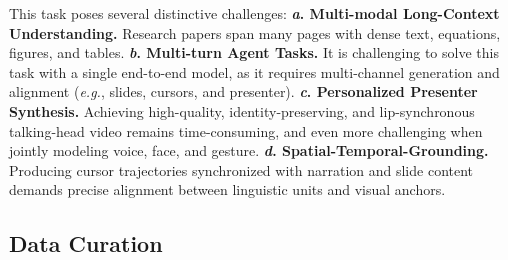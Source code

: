 \vspace{-0.2\baselineskip}
This task poses several distinctive challenges: 
\textbf{\textit{a}. Multi-modal Long-Context Understanding.} Research papers span many pages with dense text, equations, figures, and tables.
\textbf{\textit{b}. Multi-turn Agent Tasks.} It is challenging to solve this task with a single end-to-end model, as it requires multi-channel generation and alignment (\textit{e.g.}, slides, cursors, and presenter). 
\textbf{\textit{c}. Personalized Presenter Synthesis.} 
Achieving high-quality, identity-preserving, and lip-synchronous talking-head video remains time-consuming, and even more challenging when jointly modeling voice, face, and gesture.
\textbf{\textit{d}. Spatial-Temporal-Grounding.} 
Producing cursor trajectories synchronized with narration and slide content demands precise alignment between linguistic units and visual anchors. 

\vspace{-0.2\baselineskip} 
\subsection{Data Curation}

